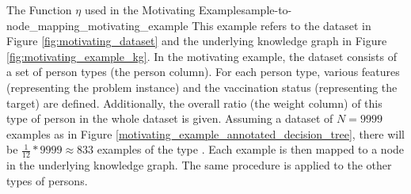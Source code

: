 \begin{Bsp}{The Function $\eta$ used in the Motivating Example}{sample-to-node_mapping_motivating_example}
This example refers to the dataset in Figure \ref{fig:motivating_dataset} and the underlying knowledge graph in Figure \ref{fig:motivating_example_kg}.
In the motivating example, the dataset consists of a set of person types (the person column). For each person type, various features (representing the problem instance) and the vaccination status (representing the target) are defined. Additionally, the overall ratio (the weight column) of this type of person in the whole dataset is given. Assuming a dataset of $N = 9999$ examples as in Figure \ref{motivating_example_annotated_decision_tree}, there will be $\frac{1}{12} * 9999 \approx 833$ examples of the type . Each example is then mapped to a node in the underlying knowledge graph. The same procedure is applied to the other types of persons.


\end{Bsp}
